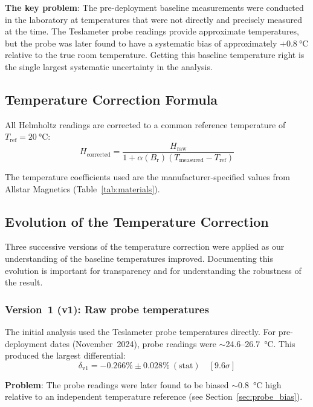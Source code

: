 \documentclass[11pt,letterpaper]{article}
\newcommand{\Br}{B_\mathrm{r}}
\newcommand{\alphar}{\alpha(\Br)}
\begin{document}
\textbf{The key problem}: The pre-deployment baseline measurements were
conducted in the laboratory at temperatures that were not directly and
precisely measured at the time. The Teslameter probe readings provide
approximate temperatures, but the probe was later found to have a systematic
bias of approximately $+\SI{0.8}{\celsius}$ relative to the true room
temperature. Getting this baseline temperature right is the single largest
systematic uncertainty in the analysis.

\subsection{Temperature Correction Formula}

All Helmholtz readings are corrected to a common reference temperature of
$T_\mathrm{ref} = \SI{20}{\celsius}$:
\begin{equation}
    H_\mathrm{corrected} = \frac{H_\mathrm{raw}}{1 + \alphar (T_\mathrm{measured} - T_\mathrm{ref})}
    \label{eq:temp_correction}
\end{equation}

The temperature coefficients used are the manufacturer-specified values from
Allstar Magnetics (Table~\ref{tab:materials}).

\subsection{Evolution of the Temperature Correction}
\label{sec:temp_history}

Three successive versions of the temperature correction were applied as our
understanding of the baseline temperatures improved. Documenting this evolution
is important for transparency and for understanding the robustness of the
result.

\subsubsection{Version~1 (v1): Raw probe temperatures}

The initial analysis used the Teslameter probe temperatures directly. For
pre-deployment dates (November~2024), probe readings were $\sim$24.6--\SI{26.7}{\celsius}. This
produced the largest differential:
\begin{equation*}
    \delta_\mathrm{v1} = -0.266\% \pm 0.028\%~(\mathrm{stat}) \quad [9.6\sigma]
\end{equation*}

\textbf{Problem}: The probe readings were later found to be biased
$\sim$\SI{0.8}{\celsius} high relative to an independent temperature reference
(see Section~\ref{sec:probe_bias}).
\end{document}
